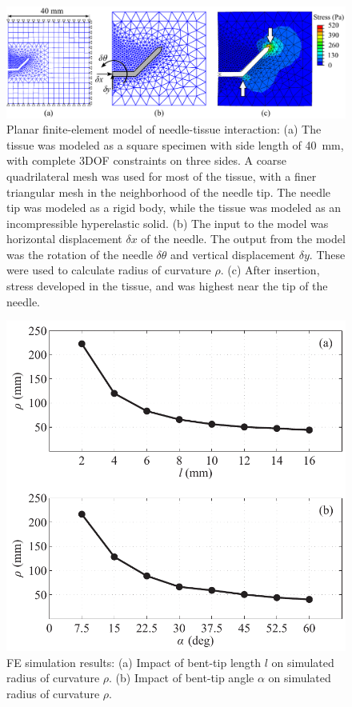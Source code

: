 \begin{figure}[!t]
\centering
\includegraphics[width = \textwidth]{Images/Chapter3/Abaqus/Abaqus}%
\caption[Planar finite-element model of needle-tissue interaction]{Planar finite-element model of needle-tissue interaction: (a) The tissue was modeled as a square specimen with side length of 40~mm, with complete 3DOF constraints on three sides. A coarse quadrilateral mesh was used for most of the tissue, with a finer triangular mesh in the neighborhood of the needle tip. The needle tip was modeled as a rigid body, while the tissue was modeled as an incompressible hyperelastic solid. (b) The input to the model was horizontal displacement $\delta x$ of the needle. The output from the model was the rotation of the needle $\delta\theta$ and vertical displacement $\delta y$. These were used to calculate radius of curvature $\rho$. (c) After insertion, stress developed in the tissue, and was highest near the tip of the needle.}
\label{fig:Abaqus}
\end{figure}

\begin{figure}[!t]
\centering
\includegraphics[width=0.6\columnwidth]{Images/Chapter3/AbaqusResults/AbaqusResults}%
\caption[FE simulation results]{FE simulation results: (a) Impact of bent-tip length $l$ on simulated radius of curvature $\rho$. (b) Impact of bent-tip angle $\alpha$ on simulated radius of curvature $\rho$.}
\label{fig:AbaqusResults}
\end{figure}

